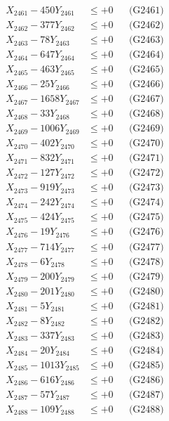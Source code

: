 \documentclass[a4paper,10pt]{article}
\begin{document}
{\begin{align}
\allowbreak
X_{2461} - 450Y_{2461} &\leq +0 && \text{(G2461)} \\
X_{2462} - 377Y_{2462} &\leq +0 && \text{(G2462)} \\
X_{2463} - 78Y_{2463} &\leq +0 && \text{(G2463)} \\
X_{2464} - 647Y_{2464} &\leq +0 && \text{(G2464)} \\
X_{2465} - 463Y_{2465} &\leq +0 && \text{(G2465)} \\
X_{2466} - 25Y_{2466} &\leq +0 && \text{(G2466)} \\
X_{2467} - 1658Y_{2467} &\leq +0 && \text{(G2467)} \\
X_{2468} - 33Y_{2468} &\leq +0 && \text{(G2468)} \\
X_{2469} - 1006Y_{2469} &\leq +0 && \text{(G2469)} \\
X_{2470} - 402Y_{2470} &\leq +0 && \text{(G2470)} \\
\allowbreak
X_{2471} - 832Y_{2471} &\leq +0 && \text{(G2471)} \\
X_{2472} - 127Y_{2472} &\leq +0 && \text{(G2472)} \\
X_{2473} - 919Y_{2473} &\leq +0 && \text{(G2473)} \\
X_{2474} - 242Y_{2474} &\leq +0 && \text{(G2474)} \\
X_{2475} - 424Y_{2475} &\leq +0 && \text{(G2475)} \\
X_{2476} - 19Y_{2476} &\leq +0 && \text{(G2476)} \\
X_{2477} - 714Y_{2477} &\leq +0 && \text{(G2477)} \\
X_{2478} - 6Y_{2478} &\leq +0 && \text{(G2478)} \\
X_{2479} - 200Y_{2479} &\leq +0 && \text{(G2479)} \\
X_{2480} - 201Y_{2480} &\leq +0 && \text{(G2480)} \\
\allowbreak
X_{2481} - 5Y_{2481} &\leq +0 && \text{(G2481)} \\
X_{2482} - 8Y_{2482} &\leq +0 && \text{(G2482)} \\
X_{2483} - 337Y_{2483} &\leq +0 && \text{(G2483)} \\
X_{2484} - 20Y_{2484} &\leq +0 && \text{(G2484)} \\
X_{2485} - 1013Y_{2485} &\leq +0 && \text{(G2485)} \\
X_{2486} - 616Y_{2486} &\leq +0 && \text{(G2486)} \\
X_{2487} - 57Y_{2487} &\leq +0 && \text{(G2487)} \\
X_{2488} - 109Y_{2488} &\leq +0 && \text{(G2488)} \\

\end{align}}
\end{document}
